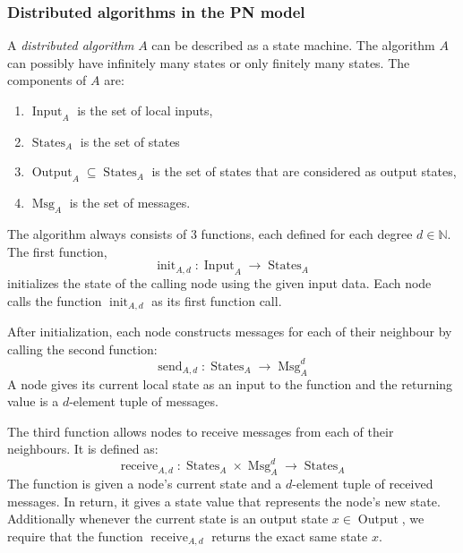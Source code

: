\subsubsection{Distributed algorithms in the PN model}

\newcommand{\algin}{\operatorname{Input}}
\newcommand{\algstates}{\operatorname{States}}
\newcommand{\algout}{\operatorname{Output}}
\newcommand{\algmsg}{\operatorname{Msg}}

\newcommand{\alginit}{\operatorname{init}}
\newcommand{\algsend}{\operatorname{send}}
\newcommand{\algrecv}{\operatorname{receive}}

A \emph{distributed algorithm} $A$ can be described as a state machine.
The algorithm $A$ can possibly have infinitely many states or only finitely many states.
The components of $A$ are:
\begin{enumerate}
  \item $\algin_A$ is the set of local inputs,
  \item $\algstates_A$ is the set of states
  \item $\algout_A \subseteq \algstates_A$ is the set of states that are considered as output states,
  \item $\algmsg_A$ is the set of messages.
\end{enumerate}

The algorithm always consists of 3 functions, each defined for each degree $d \in \mathbb{N}$.
The first function, $$\alginit_{A,d} : \algin_A \rightarrow \algstates_A$$ initializes the state of the calling node using the given input data.
Each node calls the function $\alginit_{A,d}$ as its first function call.

After initialization, each node constructs messages for each of their neighbour by calling the second function:
$$\algsend_{A,d} : \algstates_A \rightarrow \algmsg_A^d$$
A node gives its current local state as an input to the function and the returning value is a $d$-element tuple of messages.

The third function allows nodes to receive messages from each of their neighbours.
It is defined as:
$$\algrecv_{A,d} : \algstates_A \times \algmsg_A^d \rightarrow \algstates_A$$
The function is given a node's current state and a $d$-element tuple of received messages.
In return, it gives a state value that represents the node's new state.
Additionally whenever the current state is an output state $x \in \algout$, we require that the function $\algrecv_{A,d}$ returns the exact same state $x$.

